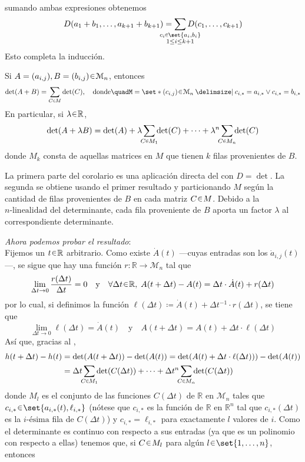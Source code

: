\begin{sol}[Demostración]
\begin{align*}
\end{align*}
sumando ambas expresiones obtenemos
\[
D(a_1 +b_1,\dots,a_{k+1}+b_{k+1})%
= \sum_{\mathclap{\substack{c_i \en \set{a_i,b_i}\\1\leq i \leq k+1}}} D(c_1,\dots,c_{k+1})
\]
Esto completa la inducción.
\begin{coro}\label{coro:detcomb}
Si $A =(a_{i,j}), B = (b_{i,j}) \en \mathcal{M}_n$, entonces
\[
\det(A + B) = \sum_{C \en M} \det(C),%
\quad\text{donde}\quad%
M = \set*{(c_{i,j}) \en \mathcal{M}_n \given c_{i,*}= a_{i,*} \vee c_{i,*} = b_{i,*}}
\]
En particular, si $\lambda \en \mathbb{R}$,
\[
\det(A + \lambda B) = \det(A) + \lambda\sum_{\mathclap{C \en M_1}}\det(C) +\dots+ \lambda^n\sum_{\mathclap{C \en M_n}}\det(C)
\]
donde $M_k$ consta de aquellas matrices en $M$ que tienen $k$ filas provenientes de $B$.
\end{coro}
La primera parte del corolario es una aplicación directa del  con $D = \det$. La segunda se obtiene usando el primer resultado y particionando $M$ según la cantidad de filas provenientes de $B$ en cada matriz $C \en M$. Debido a la $n\text{-linealidad}$ del determinante, cada fila proveniente de $B$ aporta un factor $\lambda$ al correspondiente determinante.\par\vspace{1em}
\emph{Ahora podemos probar el resultado}:\\
Fijemos un $t \en \mathbb{R}$ arbitrario. Como existe $\dot{A}(t)$ ---cuyas entradas son los $\dot{a}_{i,j}(t)$---, se sigue que hay una función $r\colon \mathbb{R} \to \mathcal{M}_n$ tal que
\[
\lim_{\Delta t \to 0} \frac{r(\Delta t)}{\Delta t} = 0%
\quad\text{y}\quad%
\forall\Delta t \en \mathbb{R},\;A(t+\Delta t) - A(t) = \Delta t \cdot \dot{A}(t) + r(\Delta t)
\]
por lo cual, si definimos la función $\ell(\Delta t) \coloneq \dot{A}(t) + \Delta t^{-1}\cdot r(\Delta t)$, se tiene que
\[
\lim_{\Delta t \to 0} \ell
(\Delta t) = \dot{A}(t)%
\quad\text{y}\quad%
A(t+\Delta t) = A(t) + \Delta t \cdot \ell(\Delta t)
\]
Así que, gracias al ,
\begin{align*}
h(t + \Delta t) - h(t)%
&= \det(A(t + \Delta t))- \det(A(t))%
= \det(A(t) + \Delta t \cdot \ell(\Delta t)))- \det(A(t))\\
&= \Delta t \sum_{\mathclap{C \en M_1}} \det(C(\Delta t)) + \dots + \Delta t^n \sum_{\mathclap{C \en M_n}} \det(C(\Delta t))
\end{align*}
donde $M_l$ es el conjunto de las funciones $C(\Delta t)$ de $\mathbb{R}$ en $\mathcal{M}_n$ tales que $c_{i,*} \en \set{a_{i,*}(t), \ell_{i,*}}$ (nótese que $c_{i,*}$ es la función de $\mathbb{R}$ en $\mathbb{R}^n$ tal que $c_{i,*}(\Delta t)$ es la $i\text{-ésima}$ fila de $C(\Delta t)$) y $c_{i,*} = \ell_{i,*}$ para exactamente $l$ valores de $i$. Como el determinante es continuo con respecto a sus entradas (ya que es un polinomio con respecto a ellas) tenemos que, si $C \en M_l$ para algún $l \en \set{1,\dots,n}$, entonces 

\end{sol}
